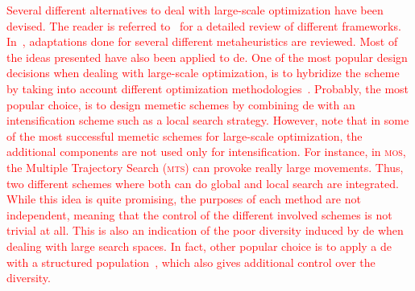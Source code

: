 \documentclass[preprint,3p]{elsarticle}
\newcommand{\DE}{{\sc de}}
\begin{document}
\textcolor{red}{
Several different alternatives to deal with large-scale optimization have been devised.
%
The reader is referred to~\cite{Mahdavi:14} for a detailed review of different frameworks.
%
In~\cite{Mahdavi:14}, adaptations done for several different metaheuristics are reviewed.
%
Most of the ideas presented have also been applied to \DE{}.
%
One of the most popular design decisions when dealing with large-scale optimization, 
is to hybridize the scheme by taking into account different optimization methodologies~\cite{Piotrowski:13}.
%
Probably, the most popular choice, is to design memetic schemes by combining \DE{} with an intensification scheme such as a local search strategy.
%
However, note that in some of the most successful memetic schemes for large-scale optimization,
the additional components are not used only for intensification.
%
For instance, in \textsc{mos}, the Multiple Trajectory Search (\textsc{mts}) can provoke really large movements.
%
Thus, two different schemes where both can do global and local search are integrated.
%
While this idea is quite promising, the purposes of each method are not independent, meaning that the control of the different involved schemes 
is not trivial at all. 
%
This is also an indication of the poor diversity induced by \DE{} when dealing with large search spaces.
%
In fact, other popular choice is to apply a \DE{} with a structured population~\cite{Weber:11}, 
which also gives additional control over the diversity.
}
\end{document}
